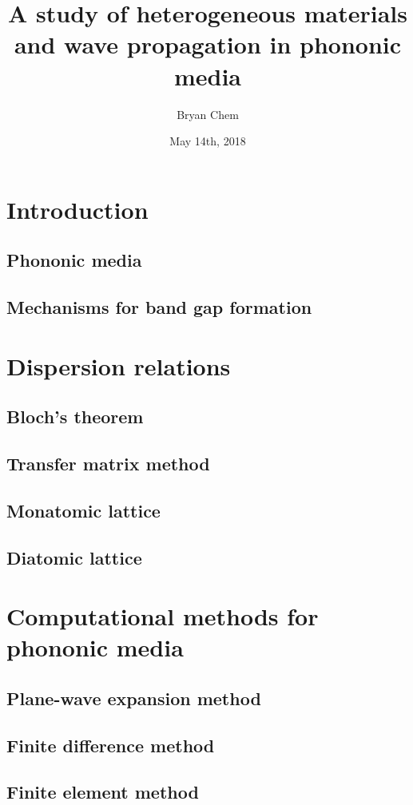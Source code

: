 \documentclass{article}
\title{A study of heterogeneous materials and wave propagation in phononic
media}
\author{Bryan Chem}
\date{May 14th, 2018}
\begin{document}

\maketitle
\newpage

\tableofcontents
\newpage


\section{Introduction}
\subsection{Phononic media}
\subsection{Mechanisms for band gap formation}
\section{Dispersion relations}
\subsection{Bloch's theorem}
\subsection{Transfer matrix method}
\subsection{Monatomic lattice}
\subsection{Diatomic lattice}
\section{Computational methods for phononic media}
\subsection{Plane-wave expansion method}
\subsection{Finite difference method}
\subsection{Finite element method}
\end{document}
